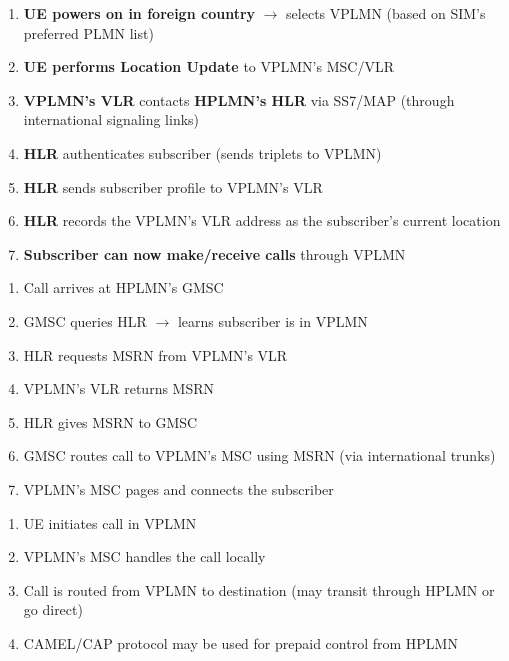 
\begin{enumerate}
\def\labelenumi{\arabic{enumi}.}
\tightlist
\item
  \textbf{UE powers on in foreign country} \ensuremath{\to} selects VPLMN (based on SIM’s preferred PLMN list)
\item
  \textbf{UE performs Location Update} to VPLMN’s MSC/\allowbreak{}VLR
\item
  \textbf{VPLMN’s VLR} contacts \textbf{HPLMN’s HLR} via SS7/\allowbreak{}MAP (through international signaling links)
\item
  \textbf{HLR} authenticates subscriber (sends triplets to VPLMN)
\item
  \textbf{HLR} sends subscriber profile to VPLMN’s VLR
\item
  \textbf{HLR} records the VPLMN’s VLR address as the subscriber’s current location
\item
  \textbf{Subscriber can now make/\allowbreak{}receive calls} through VPLMN
\end{enumerate}





\begin{enumerate}
\def\labelenumi{\arabic{enumi}.}
\tightlist
\item
  Call arrives at HPLMN’s GMSC
\item
  GMSC queries HLR \ensuremath{\to} learns subscriber is in VPLMN
\item
  HLR requests MSRN from VPLMN’s VLR
\item
  VPLMN’s VLR returns MSRN
\item
  HLR gives MSRN to GMSC
\item
  GMSC routes call to VPLMN’s MSC using MSRN (via international trunks)
\item
  VPLMN’s MSC pages and connects the subscriber
\end{enumerate}


\begin{enumerate}
\def\labelenumi{\arabic{enumi}.}
\tightlist
\item
  UE initiates call in VPLMN
\item
  VPLMN’s MSC handles the call locally
\item
  Call is routed from VPLMN to destination (may transit through HPLMN or go direct)
\item
  CAMEL/\allowbreak{}CAP protocol may be used for prepaid control from HPLMN
\end{enumerate}

